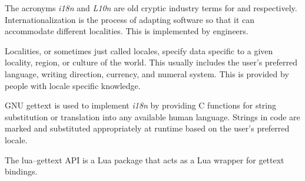 

The acronyms {\it i18n} and {\it L10n} are old cryptic industry terms for  and  respectively. Internationalization is the process of adapting software so that it can accommodate different localities. This is implemented by engineers.

Localities, or sometimes just called locales, specify data specific to a given locality, region, or culture of the world. This usually includes the user's preferred language, writing direction, currency, and numeral system. This is provided by people with locale specific knowledge.

\startitemize[4]

GNU gettext is used to implement {\it i18n} by providing C functions for string substitution or translation into any available human language. Strings in code are marked and substituted appropriately at runtime based on the user's preferred locale.


The lua--gettext API is a Lua package that acts as a Lua wrapper for gettext bindings.

\stopitemize

